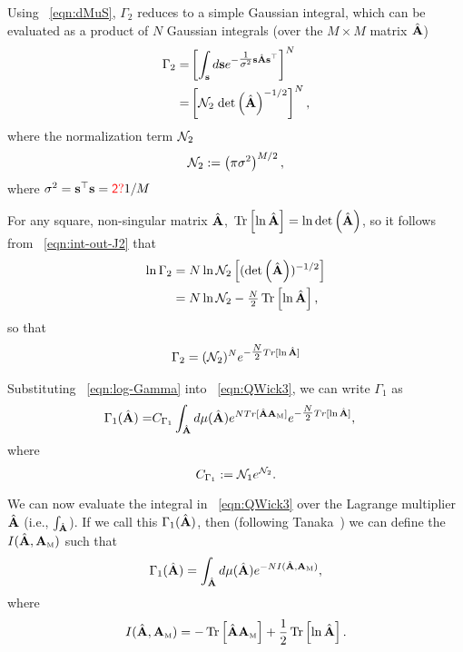 Using \EQN~\ref{eqn:dMuS}, 
$\Gamma_2$ reduces to a simple Gaussian integral, which can be evaluated as a product of $N$ Gaussian integrals (over the $M\times M$ matrix $\hat{\mathbf{A}}$)
\begin{align}
\label{eqn:int-out-J2}
\Gamma_2
   =& \left[\int_{{\mathbf{s}}} d\mathbf{s}e^{-\tfrac{1}{\sigma^{2}} \mathbf{s}\hat{\mathbf{A}}\mathbf{s}^{\top} }\right]^{N} \\
   =& \left[\mathcal{N}_2\;\mbox{}{\text{det}}\left(\hat{\mathbf{A}}\right)^{-1/2}\right]^{N}  ,
\end{align}
where the normalization term $\mathcal{N}_2$
\begin{align}
\label{eqn:norm_2}
\mathcal{N}_2 := \left(\pi\sigma^{2}\right)^{M/2}  ,
\end{align}
where $\sigma^{2}=\mathbf{s}^{\top}\mathbf{s}={\color{red}\sf{2?}}1/M$

For any square, non-singular matrix $\hat{\mathbf{A}}$,  $ \mbox{}\operatorname{Tr}\left[\ln\hat{\mathbf{A}}\right]=\ln \mbox{}{\text{det}}\left(\hat{\mathbf{A}}\right)$, so
it follows from \EQN~\ref{eqn:int-out-J2} that
\begin{align}
\nonumber
\ln\Gamma_2
   &=N\ln\NORM_2\left[( \Det \AHAT)^{-1/2} \right]  \\   %
&= N\ln\NORM_2 -\tfrac{N}{2}\Trace{ \ln\AHAT }  ,
\end{align}
so that
\begin{align}
\label{eqn:log-Gamma}
\Gamma_2 = (\mathcal{N}_2)^{N} e^{ -\tfrac{N}{2} Tr[ \ln\hat{\mathbf{A}} ] } 
\end{align}

Substituting
\EQN~\ref{eqn:log-Gamma}
into \EQN~\ref{eqn:QWick3},
we can write $\Gamma_1$ as
\begin{eqnarray}
  \label{eqn:gamma1}
\Gamma_1(\hat{\mathbf{A}})  =& C_{\Gamma_1}\int_{\hat{\mathbf{A}}} d\mu(\hat{\mathbf{A}})   e^{ N Tr[ \hat{\mathbf{A}}{\mathbf{A}}_{\text{\tiny M}} ] }  e^{ -\tfrac{N}{2} Tr[ \ln\hat{\mathbf{A}} ] }  ,
\end{eqnarray}
where
\begin{equation}
    C_{\Gamma_1}:=\mathcal{N}_1 e^{\mathcal{N}_2}.
\end{equation}

We can now evaluate the integral in \EQN~\ref{eqn:QWick3} over the Lagrange multiplier $\hat{\mathbf{A}}$ (i.e., $\int_{\hat{\mathbf{A}}} $). 
If we call this $\Gamma_1(\hat{\mathbf{A}})$,
then (following Tanaka~\cite{Tanaka2008}) we can define the \emph{\RateFunction} $I(\hat{\mathbf{A}},{\mathbf{A}}_{\text{\tiny M}})$ such that
\begin{align}
\label{eqn:LambdaA}
\Gamma_1(\hat{\mathbf{A}})=\int_{\hat{\mathbf{A}}}  d\mu(\hat{\mathbf{A}}) e^{-NI(\hat{\mathbf{A}},{\mathbf{A}}_{\text{\tiny M}})}  ,
\end{align}
where
\begin{align}
\label{eqn:IAA}
I(\hat{\mathbf{A}},{\mathbf{A}}_{\text{\tiny M}}) = -\mbox{}\operatorname{Tr}\left[ \hat{\mathbf{A}}{\mathbf{A}}_{\text{\tiny M}}\right] + \frac{1}{2}\mbox{}\operatorname{Tr}\left[ \ln\hat{\mathbf{A}} \right]  .
\end{align}


